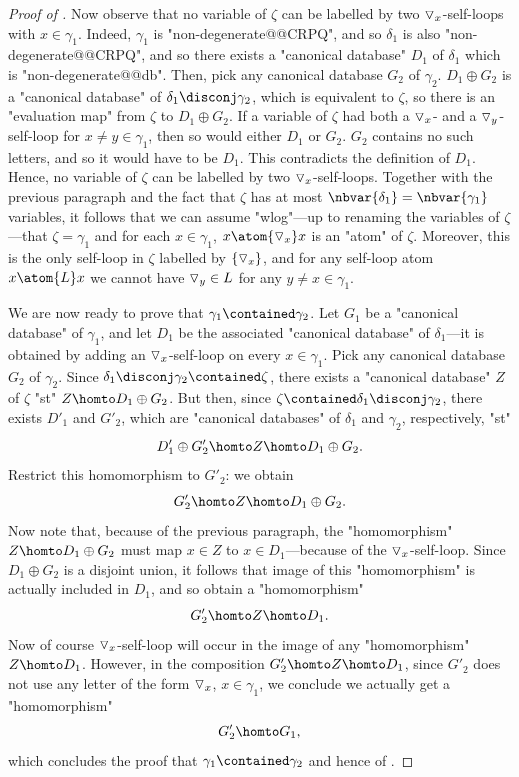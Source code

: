 \begin{proof}[Proof of ]
	Now observe that no variable of $\zeta$ can be labelled by two $\triangledown_x$-self-loops
	with $x\in \gamma_1$. Indeed, $\gamma_1$ is "non-degenerate@@CRPQ", and so $\delta_1$
	is also "non-degenerate@@CRPQ", and so there
	exists a "canonical database" $D_1$ of $\delta_1$ which is "non-degenerate@@db".
	Then, pick any canonical database $G_2$ of $\gamma_2$.
	$D_1 \oplus G_2$ is a "canonical database" of $\delta_1 \disconj \gamma_2$, which is 
	equivalent to $\zeta$, so there is an "evaluation map"
	from $\zeta$ to $D_1 \oplus G_2$. If a variable of $\zeta$ had both a
	$\triangledown_x$- and a $\triangledown_y$-self-loop for $x \neq y \in \gamma_1$,
	then so would either $D_1$ or $G_2$. $G_2$ contains no such letters, and so it would have
	to be $D_1$. This contradicts the definition of $D_1$.
	Hence, no variable of $\zeta$ can be labelled by two $\triangledown_x$-self-loops.
	Together with the previous paragraph and the fact that 
	$\zeta$ has at most $\nbvar{\delta_1} = \nbvar{\gamma_1}$ variables, it follows that
	we can assume "wlog"---up to renaming the variables of $\zeta$---that
	$\zeta = \gamma_1$ and for each $x \in \gamma_1$,
	$x \atom{\marking_x} x$ is an "atom" of $\zeta$. Moreover, this is the only self-loop in
	$\zeta$ labelled by $\{\triangledown_x\}$, and for any self-loop atom $x \atom{L} x$
	we cannot have $\triangledown_y \in L$ for any $y \neq x \in \gamma_1$. 
	
	We are now ready to prove that $\gamma_1 \contained \gamma_2$.
	Let $G_1$ be a "canonical database" of $\gamma_1$, and let $D_1$ be the associated
	"canonical database" of $\delta_1$---it is obtained by adding an $\triangledown_x$-self-loop
	on every $x \in \gamma_1$.
	Pick any canonical database $G_2$ of $\gamma_2$. Since $\delta_1 \disconj \gamma_2 \contained \zeta$, there exists a "canonical database" $Z$ of $\zeta$
	"st" $Z \homto D_1 \oplus G_2$.
	But then, since $\zeta \contained \delta_1 \disconj \gamma_2$, there exists
	$D'_1$ and $G'_2$, which are "canonical databases" of $\delta_1$ and $\gamma_2$,
	respectively, "st"
	\[
		D'_1 \oplus G'_2 \homto
		Z \homto
		D_1 \oplus G_2.
	\]
	Restrict this homomorphism to $G'_2$: we obtain 
	\[
		G'_2 \homto
		Z \homto
		D_1 \oplus G_2.
	\]
	Now note that, because of the previous paragraph,
	the "homomorphism" $Z \homto D_1 \oplus G_2$ must map $x \in Z$  
	to $x \in D_1$---because of the $\triangledown_x$-self-loop.
	Since $D_1 \oplus G_2$ is a disjoint union, it follows that image of this
	"homomorphism" is actually included in $D_1$, and so obtain a "homomorphism"
	\[
		G'_2 \homto Z \homto D_1.
	\]
	Now of course $\triangledown_x$-self-loop will occur in the image of any "homomorphism"
	$Z \homto D_1$. However, in the composition $G'_2 \homto Z \homto D_1$,
	since $G'_2$ does not use any letter of the form $\triangledown_x$, $x\in \gamma_1$,
	we conclude we actually get a "homomorphism"
	\[
		G'_2 \homto G_1,
	\]
	which concludes the proof that $\gamma_1 \contained \gamma_2$
	and hence of .
	

\end{proof}

